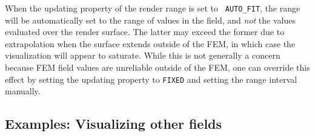 \begin{sideblock}
When the {\sf updating} property of the render range is set to {\tt
AUTO\_FIT}, the range will be automatically set to the range of values
in the field, and {\it not} the values evaluated over the render
surface. The latter may exceed the former due to extrapolation when
the surface extends outside of the FEM, in which case the
visualization will appear to saturate. While this is not generally a
concern because FEM field values are unreliable outside of the FEM,
one can override this effect by setting the {\sf updating} property to
{\tt FIXED} and setting the range interval manually.
\end{sideblock}

\subsection{Examples: Visualizing other fields}
\label{OtherFieldVisualization:sec}


